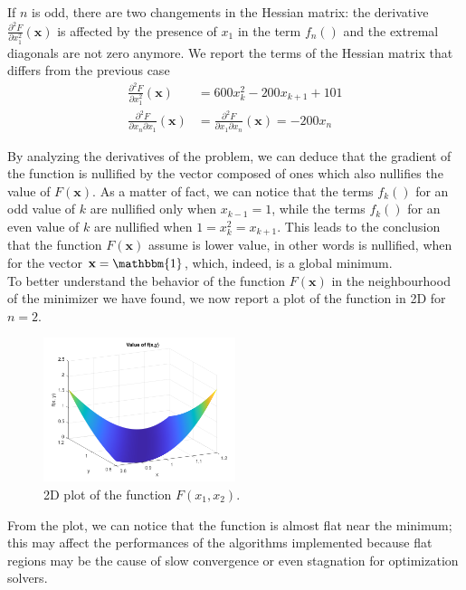 If $n$ is odd, there are two changements in the Hessian matrix: the derivative $\frac{\partial^2 F}{\partial x_1^2} (\mathbf{x}) $ is affected by the presence of $x_1$ in the term $f_n()$ and the extremal diagonals are not zero anymore. We report the terms of the Hessian matrix that differs from the previous case
\begin{align*}
    \frac{\partial^2 F}{\partial x_1^2}  (\mathbf{x}) &= 600x_k^2 - 200x_{k+1} + 101 \\
    \frac{\partial^2 F}{\partial x_n \partial x_1} (\mathbf{x}) &= \frac{\partial^2 F}{\partial x_1 \partial x_n} (\mathbf{x}) = -200x_n
\end{align*}

By analyzing the derivatives of the problem, we can deduce that the gradient of the function is nullified by the vector composed of ones which also nullifies the value of $F(\mathbf{x})$. 
As a matter of fact, we can notice that the terms $f_k()$ for an odd value of $k$ are nullified only when $x_{k - 1} = 1$, while the terms $f_k()$ for an even value of $k$ are nullified when $1 = x_k^2 = x_{k+1}$. This leads to the conclusion that the function $F(\mathbf{x})$ assume is lower value, in other words is nullified, when for the vector $\mathbf{x} = \mathbbm{1}$, which, indeed, is a global minimum.
\\ To better understand the behavior of the function $F(\mathbf{x})$ in the neighbourhood of the minimizer we have found, we now report a plot of the function in 2D for $n = 2$. 
\begin{figure}[htbp]
    \centering
    \includegraphics[width=0.5\textwidth]{img/pb25_fig.png}
    \caption{2D plot of the function $F(x_1, x_2)$.}
\end{figure}
From the plot, we can notice that the function is almost flat near the minimum; this may affect the performances of the algorithms implemented because flat regions may be the cause of slow convergence or even stagnation for optimization solvers. 

 
\medskip
